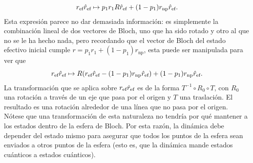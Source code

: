 \begin{equation}
    r_{\text{ef}}\hat{r}_{\text{ef}}\mapsto p_{1}r_{1}R\hat{r}_{\text{ef}}+(1-p_{1})r_{\text{np}}\hat{r}_{\text{ef}}.\nonumber
\end{equation}
Esta expresión parece no dar demasiada información: es simplemente la combinación lineal de dos vectores de Bloch, uno que ha sido rotado y otro al que no se le ha hecho nada, pero recordando que el vector de Bloch del estado efectivo inicial cumple $r=p_{1}r_{1}+(1-p_{1})r_{\text{np}}$, esta puede ser manipulada para ver que
\begin{equation}
    r_{\text{ef}}\hat{r}_{\text{ef}}\mapsto R(r_{\text{ef}}\hat{r}_{\text{ef}}-(1-p_{1})r_{\text{np}}\hat{r}_{\text{ef}})+(1-p_{1})r_{\text{np}}\hat{r}_{\text{ef}}.\nonumber
\end{equation}
La transformación que se aplica sobre $r_{\text{ef}}\hat{r}_{\text{ef}}$ es de la forma $T^{-1}\circ R_{0}\circ T$, con $R_{0}$ una rotación a través de un eje que pasa por el origen y $T$ una traslación. El resultado es una rotación alrededor de una línea que no pasa por el origen. Nótese que una transformación de esta naturaleza no tendría por qué mantener a los estados dentro de la esfera de Bloch. Por esta razón, la dinámica debe depender del estado mismo para asegurar que todos los puntos de la esfera sean enviados a otros puntos de la esfera (esto es, que la dinámica mande estados cuánticos a estados cuánticos).
